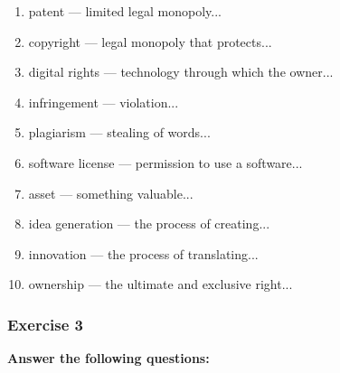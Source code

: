 \documentclass{article}
\begin{document}
\begin{multicols}{2}
\begin{enumerate}
    \item patent — limited legal monopoly...
    \item copyright — legal monopoly that protects...
    \item digital rights — technology through which the owner...
    \item infringement — violation...
    \item plagiarism — stealing of words... 
    \item software license — permission to use a software...
    \item asset — something valuable...
    \item idea generation — the process of creating...
    \item innovation — the process of translating...
    \item ownership — the ultimate and exclusive right...
\end{enumerate}
\end{multicols}

\subsubsection{Exercise 3}

\textbf{Answer the following questions:}
\end{document}
